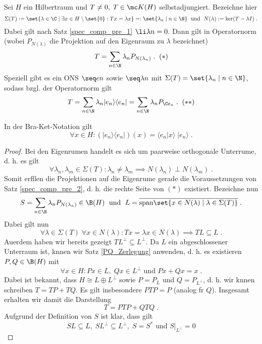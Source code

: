 \begin{theorem}
	\label{spec_comp}
	Sei $H$ ein Hilbertraum und \(T\neq 0, \; T\in \mc K(H)\) selbstadjungiert. Bezeichne hier  \[\Sigma(T) := \set{\lambda \in \C \;\vert\; \exists x \in H\setminus \set{0}: Tx = \lambda x} =: \set{\lambda_n\;\vert\; n\in\N} \;\text{ und }\; N(\lambda) := \ker(T - \lambda I)\;.\]
	Dabei gilt nach Satz \ref{spec_comp_pre_1} \(\li \lambda n = 0\).
	Dann gilt in Operatornorm (wobei \(P_{N(\lambda)}\) die Projektion auf den Eigenraum zu $\lambda$ bezeichnet)
	\[T = \sum_{n\in\N} \lambda_n P_{N(\lambda_n)}\;.\;\;(*)\]
	Speziell gibt es ein ONS \(\seq en\) sowie \(\seq \lambda n\) mit \(\Sigma(T) = \set{\lambda_n\;\vert\;n\in\N}\), sodass bzgl. der Operatornorm gilt
	\[T = \sum_{n\in\N} \lambda_n \vert e_n \rangle \langle e_n\vert = \sum_{n\in\N} \lambda_n P_{\C e_n}\;.\;\;(**)\]
	\begin{rem}
		In der Bra-Ket-Notation gilt
		\[\forall x \in H : (\vert e_n \rangle \langle e_n\vert)(x) =  \langle e_n \vert x \rangle \;\vert e_n \rangle\;.\]
	\end{rem}
	\begin{proof}
		Bei den Eigenr\as umen handelt es sich um paarweise orthogonale Unterr\as ume, d. h. es gilt 
		\[\forall \lambda_n, \lambda_m \in \Sigma(T): \lambda_n \neq \lambda_m \implies N(\lambda_n) \perp N(\lambda_m)\;.\]
		Somit erf\us llen die Projektionen auf die Eigenr\as ume gerade die Voraussetzungen von Satz \ref{spec_comp_pre_2}, d. h. die rechte Seite von \((*)\) existiert.  Bezeichne nun 
		\[S = \sum_{n\in\N} \lambda_n P_{N(\lambda_n)} \in \B(H)\;\text{ und } \; L = \overline{\text{span}\set{x \in N(\lambda)\;\vert\; \lambda \in \Sigma(T)}}\;.\]
		Dabei gilt nun 
		\[\forall \lambda \in \Sigma(T) \;\forall x\in N(\lambda): Tx = \lambda x \in N(\lambda) \implies TL \subseteq L\;.\]
		Au\s erdem haben wir bereits gezeigt \(TL^\perp \subseteq L^\perp\).
		Da $L$ ein abgeschlossener Unterraum ist, k\os nnen wir Satz \ref{PQ_Zerlegung} anwenden, d. h. es existieren \(P, Q \in \B(H)\) mit 
		\[\forall x \in H: Px \in L,\; Qx \in L^\perp \text{ und } Px + Qx = x \;.\]
		Dabei ist bekannt, dass \(H\cong L \oplus L^\perp\) sowie \(P = P_L\) und \(Q = P_{L^\perp}\), d. h. wir k\os nnen schreiben \(T = TP + TQ\). Es gilt insbesondere $PTP = P$ (analog f\us r $Q$). Insgesamt erhalten wir damit die Darstellung
		\[ T = PTP + QTQ\;.\]
		Aufgrund der Definition von $S$ ist klar, dass gilt
		\[SL \subseteq L,\; SL^\perp \subseteq L^\perp, \; S = S^* \text{ und }  S\vert_{L^\perp} = 0\]

\end{proof}
\end{theorem}
